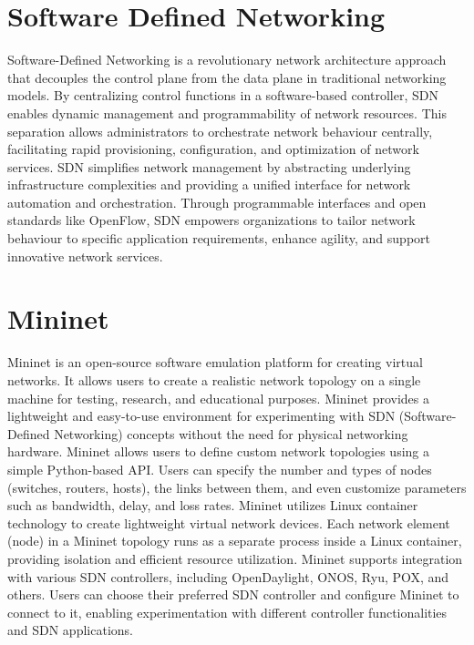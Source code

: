 \section{Software Defined Networking}
\vspace{-18pt}
Software-Defined Networking is a revolutionary network architecture approach that decouples the control plane from the data plane in traditional networking models. By centralizing control functions in a software-based controller, SDN enables dynamic management and programmability of network resources. This separation allows administrators to orchestrate network behaviour centrally, facilitating rapid provisioning, configuration, and optimization of network services. SDN simplifies network management by abstracting underlying infrastructure complexities and providing a unified interface for network automation and orchestration. Through programmable interfaces and open standards like OpenFlow, SDN empowers organizations to tailor network behaviour to specific application requirements, enhance agility, and support innovative network services.
\section{Mininet}
\vspace{-18pt}
Mininet is an open-source software emulation platform for creating virtual networks. It allows users to create a realistic network topology on a single machine for testing, research, and educational purposes. Mininet provides a lightweight and easy-to-use environment for experimenting with SDN (Software-Defined Networking) concepts without the need for physical networking hardware. Mininet allows users to define custom network topologies using a simple Python-based API. Users can specify the number and types of nodes (switches, routers, hosts), the links between them, and even customize parameters such as bandwidth, delay, and loss rates. Mininet utilizes Linux container technology to create lightweight virtual network devices. Each network element (node) in a Mininet topology runs as a separate process inside a Linux container, providing isolation and efficient resource utilization. Mininet supports integration with various SDN controllers, including OpenDaylight, ONOS, Ryu, POX, and others. Users can choose their preferred SDN controller and configure Mininet to connect to it, enabling experimentation with different controller functionalities and SDN applications.
